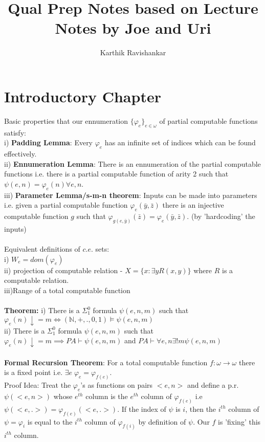 \documentclass{article}
\title{Qual Prep Notes based on Lecture Notes by Joe and Uri}
\author{Karthik Ravishankar}
\begin{document}
	\maketitle
	\tableofcontents
	\newpage
   \section{Introductory Chapter}
   Basic properties that our ennumeration $\{\varphi_e\}_{e\in \omega}$ of partial computable functions satisfy:\\
   i) \textbf{Padding Lemma}: Every $\varphi_e$ has an infinite set of indices which can be found effectively.\\
   ii) \textbf{Ennumeration Lemma}: There is an ennumeration of the partial computable functions i.e. there is a partial computable function of arity 2 such that $\psi(e,n) = \varphi_e(n) \forall e,n$.\\
   iii) \textbf{Parameter Lemma/s-m-n theorem}: Inputs can be made into parameters i.e. given a partial computable function $\varphi_e(\bar{y},\bar{z})$ there is an injective computable function $g$ such that $\varphi_{g(e,\bar{y})}(\bar{z}) = \varphi_e(\bar{y},\bar{z})$. (by 'hardcoding' the inputs)\\
   \\
   Equivalent definitions of $c.e.$ sets: \\
   i) $W_e = dom(\varphi_e)$\\
   ii) projection of computable relation - $X = \{x : \exists y R(x,y)\}$ where $R$ is a computable relation.\\
   iii)Range of a total computable function \\
   \\
   \textbf{Theorem:} i) There is a $\Sigma^0_1$ formula $\psi(e,n,m)$ such that $\varphi_e(n)\downarrow = m \iff (\mathbb{N},+,.,0,1) \models \psi(e,n,m)$\\
   ii)  There is a $\Sigma^0_1$ formula $\psi(e,n,m)$ such that $\varphi_e(n)\downarrow = m \implies PA \vdash \psi(e,n,m)$ and $PA \vdash \forall e,n \exists ! m \psi(e,n,m)$\\
   \\
   \textbf{Formal Recursion Theorem}: For a total computable function $f: \omega \to \omega$ there is a fixed point i.e. $\exists e \; \varphi_e = \varphi_{f(e)}$.\\
   Proof Idea: Treat the $\varphi_e$'s as functions on pairs $<e,n>$ and define a p.r.  $\psi(<e,n>)$ whose $e^{th}$ column is the $e^{th}$ column of $\varphi_{f(e)}$ i.e $\psi(<e,.>) = \varphi_{f(e)}(<e,.>)$. If the index of $\psi$ is $i$, then the $i^{th}$ column of $\psi = \varphi_i $ is equal to the $i^{th}$ column of $\varphi_{f(i)}$ by definition of $\psi$. Our $f$ is 'fixing' this $i^{th}$ column.
\end{document}
